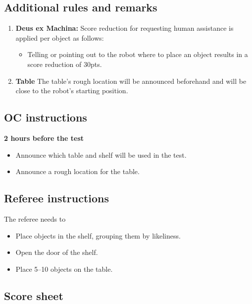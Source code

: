 %
%
\subsection*{Additional rules and remarks}
\begin{enumerate}
		\item \textbf{Deus ex Machina:} Score reduction for requesting human assistance is applied per object as follows:
	\begin{itemize}[nosep]
		\item Telling or pointing out to the robot where to place an object results in a score reduction of 30pts.
	\end{itemize}

	\item \textbf{Table} The table's rough location will be announced beforehand and will be close to the robot's starting position.
\end{enumerate}

\newpage
\subsection*{OC instructions}

\textbf{2 hours before the test}
\begin{itemize}
	\item Announce which table and shelf will be used in the test.
	\item Announce a rough location for the table.
\end{itemize}

\subsection*{Referee instructions}
The referee needs to
\begin{itemize}
	\item Place objects in the shelf, grouping them by likeliness.
	\item Open the door of the shelf.
	\item Place 5--10 objects on the table.
\end{itemize}


\subsection*{Score sheet}


